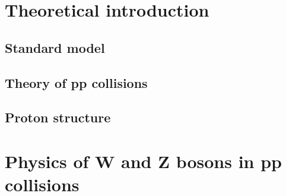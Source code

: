 \chapter{Theoretical introduction}
\section{Standard model}
\section{Theory of pp collisions}
\section{Proton structure}

\chapter{Physics of W and Z bosons in pp collisions}
